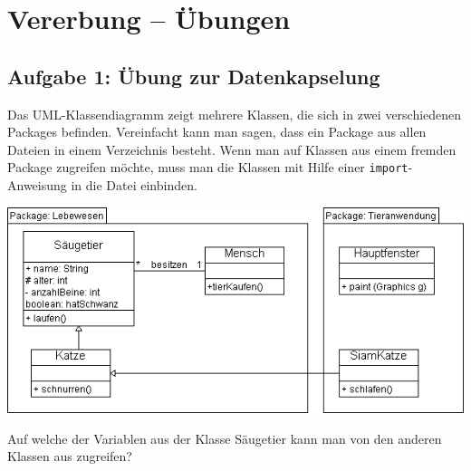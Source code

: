 \clearpage

\rehead[]{\textcolor{lightblue}{AvHG, Inf, My}}
\lohead[]{\textcolor{lightblue}{AvHG, Inf, My}}

\section{Vererbung -- Übungen}

\subsection{Aufgabe 1: Übung zur Datenkapselung}

Das UML-Klassendiagramm zeigt mehrere Klassen, die sich in zwei verschiedenen
Packages befinden. Vereinfacht kann man sagen, dass ein Package aus allen
Dateien in einem Verzeichnis besteht. Wenn man auf Klassen aus einem fremden
Package zugreifen möchte, muss man die Klassen mit Hilfe einer \verb|import|-
Anweisung in die Datei einbinden.

\includegraphics[width=1.0\textwidth]{./inf/SEKII/16_Java_Vererbung/Aufgabe1.png}

Auf welche der Variablen aus der Klasse Säugetier kann man von den anderen
Klassen aus zugreifen?

